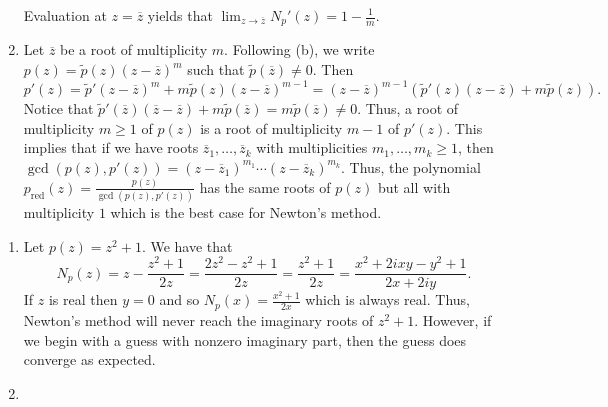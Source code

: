 \documentclass[letterpaper, 11pt, oneside]{book}
\begin{document}
\begin{sol}
\begin{enumerate}
\[          \]
          Evaluation at $z = \overline{z}$ yields that $\lim_{z \to \overline{z}} N_{p}'(z) = 1 - \frac{1}{m}$.
    \item Let $\overline{z}$ be a root of multiplicity $m$.
          Following (b), we write $p(z) = \tilde{p}(z)(z - \overline{z})^{m}$ such that $\tilde{p}(\overline{z}) \neq 0$.
          Then
          \[
            p'(z) = \tilde{p}'(z - \overline{z})^{m} + m\tilde{p}(z)(z - \overline{z})^{m - 1} = (z - \overline{z})^{m - 1}(\tilde{p}'(z)(z - \overline{z}) + m\tilde{p}(z)).
          \]
          Notice that $\tilde{p}'(\overline{z})(\overline{z} - \overline{z}) + m\tilde{p}(\overline{z}) = m\tilde{p}(\overline{z}) \neq 0$.
          Thus, a root of multiplicity $m \geq 1$ of $p(z)$ is a root of multiplicity $m - 1$ of $p'(z)$.
          This implies that if we have roots $\overline{z}_{1}, \ldots, \overline{z}_{k}$ with multiplicities $m_{1}, \ldots, m_{k} \geq 1$, then $\gcd(p(z), p'(z)) = (z - \overline{z}_{1})^{m_{1}} \cdots (z - \overline{z}_{k})^{m_{k}}$.
          Thus, the polynomial $p_{\mathrm{red}}(z) = \frac{p(z)}{\gcd(p(z), p'(z))}$ has the same roots of $p(z)$ but all with multiplicity $1$ which is the best case for Newton's method.
  \end{enumerate}
\end{sol}

\begin{sol}\label{ex:UAG_2.1.9}
  \begin{enumerate}
    \item Let $p(z) = z^{2} + 1$.
          We have that
          \[
            N_{p}(z) = z - \frac{z^{2} + 1}{2z} = \frac{2z^{2} - z^{2} + 1}{2z} = \frac{z^{2} + 1}{2z} = \frac{x^{2} + 2ixy - y^{2} + 1}{2x + 2iy}.
          \]
          If $z$ is real then $y = 0$ and so $N_{p}(x) = \frac{x^{2} + 1}{2x}$ which is always real.
          Thus, Newton's method will never reach the imaginary roots of $z^{2} + 1$.
          However, if we begin with a guess with nonzero imaginary part, then the guess does converge as expected.
    \item {}
  \end{enumerate}
\end{sol}
\end{document}
